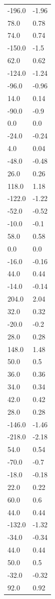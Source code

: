 \begin{longtable}{ll}
-196.0 & -1.96 \\
78.0 & 0.78 \\
74.0 & 0.74 \\
-150.0 & -1.5 \\
62.0 & 0.62 \\
-124.0 & -1.24 \\
-96.0 & -0.96 \\
14.0 & 0.14 \\
-90.0 & -0.9 \\
0.0 & 0.0 \\
-24.0 & -0.24 \\
4.0 & 0.04 \\
-48.0 & -0.48 \\
26.0 & 0.26 \\
118.0 & 1.18 \\
-122.0 & -1.22 \\
-52.0 & -0.52 \\
-10.0 & -0.1 \\
58.0 & 0.58 \\
0.0 & 0.0 \\
-16.0 & -0.16 \\
44.0 & 0.44 \\
-14.0 & -0.14 \\
204.0 & 2.04 \\
32.0 & 0.32 \\
-20.0 & -0.2 \\
28.0 & 0.28 \\
148.0 & 1.48 \\
50.0 & 0.5 \\
36.0 & 0.36 \\
34.0 & 0.34 \\
42.0 & 0.42 \\
28.0 & 0.28 \\
-146.0 & -1.46 \\
-218.0 & -2.18 \\
54.0 & 0.54 \\
-70.0 & -0.7 \\
-18.0 & -0.18 \\
22.0 & 0.22 \\
60.0 & 0.6 \\
44.0 & 0.44 \\
-132.0 & -1.32 \\
-34.0 & -0.34 \\
44.0 & 0.44 \\
50.0 & 0.5 \\
-32.0 & -0.32 \\
92.0 & 0.92 \\

\end{longtable}
